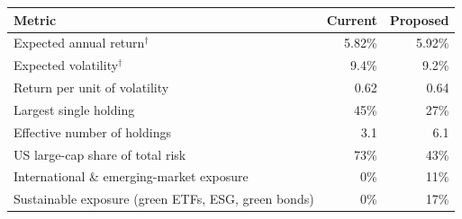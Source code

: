 \begin{tabular}{@{}lrr@{}}
\toprule
\textbf{Metric} & \textbf{Current} & \textbf{Proposed} \\
\midrule
Expected annual return$^{\dagger}$ & 5.82\% & 5.92\% \\
Expected volatility$^{\dagger}$ & 9.4\% & 9.2\% \\
Return per unit of volatility & 0.62 & 0.64 \\
Largest single holding & 45\% & 27\% \\
Effective number of holdings & 3.1 & 6.1 \\
US large-cap share of total risk & 73\% & 43\% \\
International \& emerging-market exposure & 0\% & 11\% \\
Sustainable exposure (green ETFs, ESG, green bonds) & 0\% & 17\% \\
\bottomrule
\end{tabular}